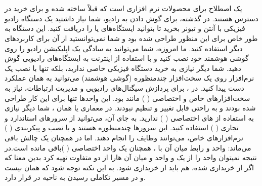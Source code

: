 \documentclass[landscape, 12pt]{report}
\begin{document}
\section*{}
یک اصطلاح برای محصولات نرم افزاری است که قبلاً ساخته شده و برای خرید در دسترس هستند. در گذشته، برای گوش دادن به رادیو، شما نیاز داشتید یک دستگاه رادیو فیزیکی با آنتن و تیونر بخرید تا بتوانید ایستگاه‌های
  یا
    را دریافت کنید. این دستگاه به طور خاص برای این منظور طراحی شده بود و شما نمی‌توانستید از آن برای کاربردهای دیگر استفاده کنید. ما امروزه، شما می‌توانید به سادگی یک اپلیکیشن رادیو را روی گوشی هوشمند خود نصب کنید و با استفاده از اینترنت به ایستگاه‌های رادیویی گوش دهید. شما دیگر نیازی به خرید دستگاه فیزیکی خاصی ندارید، بلکه تنها با نصب یک نرم‌افزار روی یک سخت‌افزار چندمنظوره (گوشی هوشمند) می‌توانید به همان عملکرد دست پیدا کنید. در 
    ، برای پردازش سیگنال‌های رادیویی و مدیریت ارتباطات، نیاز به سخت‌افزارهای خاص و اختصاصی
    (
  ) مانند 
   بود. این واحدها تنها برای این کار طراحی شده بودند و به راحتی قابل تغییر و تنظیم نبودند. در معماری
     یا همان
     ، شما دیگر نیازی به استفاده از
      های اختصاصی (
    ) ندارید. به جای آن، می‌توانید از سرورهای استاندارد و تجاری (
    ) استفاده کنید. این سرورها چندمنظوره هستند و با نصب و پیکربندی  (
    ) نرم‌افزارهای خاص، می‌توانند وظایف
     را انجام دهند. اما در
       همچنان یک چالش باقی می‌ماند: واحد
          و رابط میان آن با
            ، همچنان یک واحد اختصاصی (
            )باقی مانده است.در نتیجه نمیتوان واحد 
             را از یک
              و  واحد 
               و 
                 میان آن ‌هارا از دو
                   متفاوت تهیه کرد بدین معنا که اگر
                    از 
                     خریداری شده،
                       هم باید از
                         خریداری شود. به این نکته توجه شود که
                           همان
                             نیست و
                              در مسیر تکاملی رسیدن به ناحیه 
                              در
                               قرار دارد.
\end{document}
